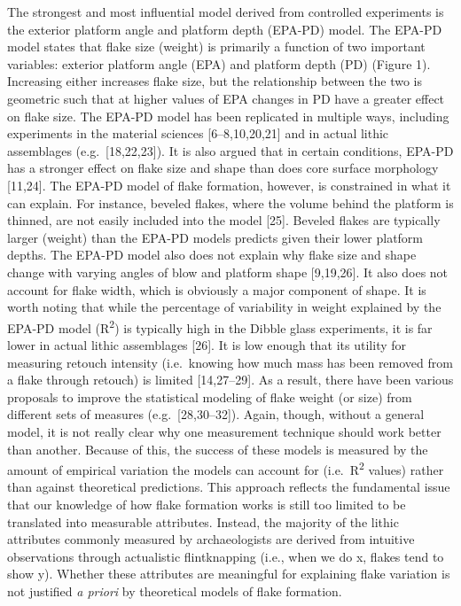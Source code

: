 \documentclass[10pt,letterpaper]{article}
\begin{document}
The strongest and most influential model derived from controlled
experiments is the exterior platform angle and platform depth (EPA-PD)
model. The EPA-PD model states that flake size (weight) is primarily a
function of two important variables: exterior platform angle (EPA) and
platform depth (PD) (Figure 1). Increasing either increases flake size,
but the relationship between the two is geometric such that at higher
values of EPA changes in PD have a greater effect on flake size. The
EPA-PD model has been replicated in multiple ways, including experiments
in the material sciences {[}6--8,10,20,21{]} and in actual lithic
assemblages (e.g.~{[}18,22,23{]}). It is also argued that in certain
conditions, EPA-PD has a stronger effect on flake size and shape than
does core surface morphology {[}11,24{]}. The EPA-PD model of flake
formation, however, is constrained in what it can explain. For instance,
beveled flakes, where the volume behind the platform is thinned, are not
easily included into the model {[}25{]}. Beveled flakes are typically
larger (weight) than the EPA-PD models predicts given their lower
platform depths. The EPA-PD model also does not explain why flake size
and shape change with varying angles of blow and platform shape
{[}9,19,26{]}. It also does not account for flake width, which is
obviously a major component of shape. It is worth noting that while the
percentage of variability in weight explained by the EPA-PD model
(R\textsuperscript{2}) is typically high in the Dibble glass
experiments, it is far lower in actual lithic assemblages {[}26{]}. It
is low enough that its utility for measuring retouch intensity
(i.e.~knowing how much mass has been removed from a flake through
retouch) is limited {[}14,27--29{]}. As a result, there have been
various proposals to improve the statistical modeling of flake weight
(or size) from different sets of measures (e.g.~{[}28,30--32{]}). Again,
though, without a general model, it is not really clear why one
measurement technique should work better than another. Because of this,
the success of these models is measured by the amount of empirical
variation the models can account for (i.e.~R\textsuperscript{2} values)
rather than against theoretical predictions. This approach reflects the
fundamental issue that our knowledge of how flake formation works is
still too limited to be translated into measurable attributes. Instead,
the majority of the lithic attributes commonly measured by
archaeologists are derived from intuitive observations through
actualistic flintknapping (i.e., when we do x, flakes tend to show y).
Whether these attributes are meaningful for explaining flake variation
is not justified \emph{a priori} by theoretical models of flake
formation.
\end{document}
